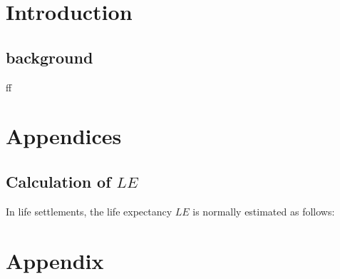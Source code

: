 \documentclass[a4paper]{article}
\begin{document}
\onehalfspace
\setcounter{page}{1}

\section{Introduction}\label{intro}
\subsection{background}

ff


\section*{Appendices}\label{append}

\renewcommand{\thesubsection}{\Alph{subsection}}

\subsection{Calculation of $LE$}\label{app1}

In life settlements, the life expectancy $LE$ is normally estimated as follows:


\newline





\newpage
\onehalfspace



\section*{Appendix}\label{append}

\renewcommand{\thesubsection}{\Alph{subsection}}
\end{document}
